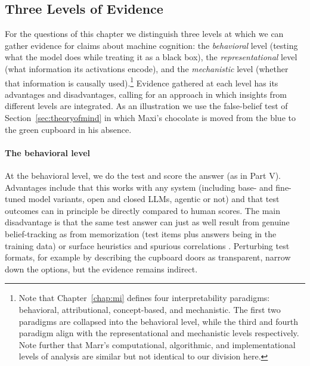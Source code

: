 \subsection{Three Levels of Evidence}\label{sec:levels}
For the questions of this chapter we distinguish three levels at which we can gather evidence for claims about machine cognition: the \emph{behavioral} level (testing what the model does while treating it as a black box), the \emph{representational} level (what information its activations encode), and the \emph{mechanistic} level (whether that information is causally used).\footnote{Note that Chapter~\ref{chap:mi} defines four interpretability paradigms: behavioral, attributional, concept-based, and mechanistic. The first two paradigms are collapsed into the behavioral level, while the third and fourth paradigm align with the representational and mechanistic levels respectively. Note further that Marr's computational, algorithmic, and implementational levels of analysis \citep{marr1982vision} are similar but not identical to our division here.} Evidence gathered at each level has its advantages and disadvantages, calling for an approach in which insights from different levels are integrated. As an illustration we use the false-belief test of Section~\ref{sec:theoryofmind} in which Maxi's chocolate is moved from the blue to the green cupboard in his absence. 

\paragraph{The behavioral level} At the behavioral level, we do the test and score the answer (as in Part V). Advantages include that this works with any system (including base- and fine-tuned model variants, open and closed LLMs, agentic or not) and that test outcomes can in principle be directly compared to human scores. The main disadvantage is that the same test answer can just as well result from genuine belief-tracking as from memorization (test items plus answers being in the training data) or surface heuristics and spurious correlations \citep[for discussion see][]{hu2025reevaluatingtheorymindevaluation,kouwenhoven2026traces}. Perturbing test formats, for example by describing the cupboard doors as transparent, narrow down the options, but the evidence remains indirect.

